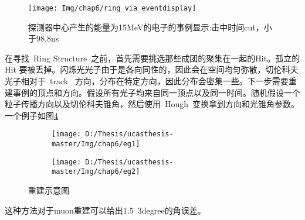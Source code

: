 \begin{figure}[!htbp]
  \centering
   \texttt{[image: Img/chap6/ring\_via\_eventdisplay]}
    \caption{探测器中心产生的能量为15MeV的电子的事例显示:击中时间cut，小于98.8ns}
  \label{fig:p61}
\end{figure}
在寻找~Ring Structure~之前，首先需要挑选那些成团的聚集在一起的Hit。孤立的Hit 要被丢掉。闪烁光光子由于是各向同性的，因此会在空间均匀弥散，切伦科夫光子相对于~track~ 方向，分布在特定方向，因此分布会密集一些。下一步需要重建事例的顶点和方向。假设所有光子均来自同一顶点以及同一时间。随机假设一个粒子传播方向以及切伦科夫锥角，然后使用~Hough~变换拿到方向和光锥角参数。一个例子如图\ref{fig:p62}
\begin{figure}[!htbp]
  \centering
  \begin{subfigure}[b]{\MySubFactor\textwidth}
    \texttt{[image: D:/Thesis/ucasthesis-master/Img/chap6/eg1]}
    \caption{}
    \label{fig:p62_1}
  \end{subfigure}%
  \quad\quad\quad\quad\quad\quad%
  \begin{subfigure}[b]{\MySubFactor\textwidth}
    \texttt{[image: D:/Thesis/ucasthesis-master/Img/chap6/eg2]}
    \caption{}
    \label{fig:p62_2}
  \end{subfigure}
  \caption{重建示意图}
  \label{fig:p62}
\end{figure}
这种方法对于muon重建可以给出1.5~3degree的角误差。
